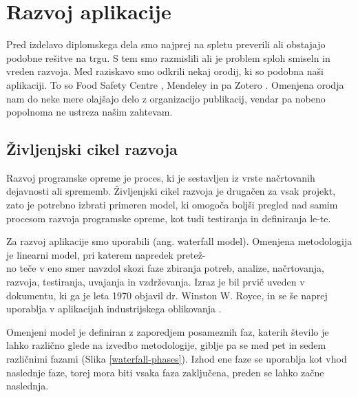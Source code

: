 

\chapter{Razvoj aplikacije}
\label{pregled-podrocja-chapter}

Pred izdelavo diplomskega dela smo najprej na spletu preverili ali obstajajo podobne rešitve na trgu. S tem smo razmislili ali je problem sploh smiseln in vreden razvoja. Med raziskavo smo odkrili nekaj orodij, ki so podobna naši aplikaciji. To so Food Safety Centre \cite{food-safety-centre}, Mendeley \cite{mendeley-manager} in pa Zotero \cite{zotero-manager}. Omenjena orodja nam do neke mere olajšajo delo z organizacijo publikacij, vendar pa nobeno popolnoma ne ustreza našim zahtevam.


\section{Življenjski cikel razvoja }
Razvoj programske opreme je proces, ki je sestavljen iz vrste načrtovanih dejavnosti ali sprememb. Življenjski cikel razvoja je drugačen za vsak projekt, zato je potrebno izbrati primeren model, ki omogoča boljši pregled nad samim procesom razvoja programske opreme, kot tudi testiranja in definiranja le-te.

Za razvoj aplikacije smo uporabili  (ang. waterfall model). Omenjena metodologija je linearni model, pri katerem napredek pretež-\\no teče v eno smer navzdol skozi faze zbiranja potreb, analize, načrtovanja, razvoja, testiranja, uvajanja in vzdrževanja. Izraz je bil prvič uveden v dokumentu, ki ga je leta 1970 objavil dr. Winston W. Royce, in se še naprej uporablja v aplikacijah industrijskega oblikovanja \cite{waterfall-model}.

Omenjeni model je definiran z zaporedjem posameznih faz, katerih število je lahko različno glede na izvedbo metodologije, giblje pa se med pet in sedem različnimi fazami (Slika \ref{waterfall-phases}). Izhod ene faze se uporablja kot vhod naslednje faze, torej mora biti vsaka faza zaključena, preden se lahko začne naslednja.

